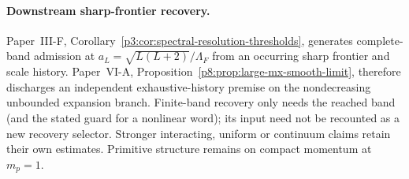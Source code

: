 \documentclass[12pt,a4paper]{article}
\begin{document}
\paragraph{Downstream sharp-frontier recovery.}
Paper~III-F, Corollary~\ref{p3:cor:spectral-resolution-thresholds},
generates complete-band admission at
$a_L=\sqrt{L(L+2)}/\Lambda_F$ from an occurring sharp frontier and scale
history. Paper~VI-A, Proposition~\ref{p8:prop:large-mx-smooth-limit},
therefore discharges an independent exhaustive-history premise on the
nondecreasing unbounded expansion branch. Finite-band recovery only needs
the reached band (and the stated guard for a nonlinear word); its input
need not be recounted as a new recovery selector. Stronger interacting,
uniform or continuum claims retain their own estimates. Primitive
structure remains on compact momentum at $m_p=1$.


\clearpage

\printbibliography
\end{document}
